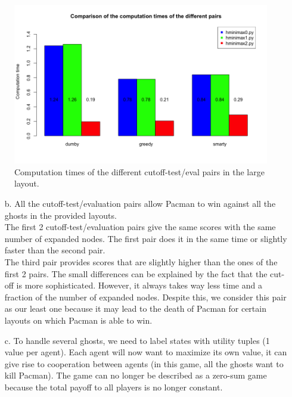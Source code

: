 \documentclass{article}
\begin{document}
		\begin{figure}[H]
			\centering
			\includegraphics[scale=0.45]{plots/3a_times.png} 
			\caption{Computation times of the different cutoff-test/eval pairs in the large layout.}
		\end{figure}
\begin{enumerate}[label=\alph*.,leftmargin=*]	
	\item[b.] All the cutoff-test/evaluation pairs allow Pacman to win against all the ghosts in the provided layouts.\\
	The first 2 cutoff-test/evaluation pairs give the same scores with the same number of expanded nodes. The first pair does it in the same time or slightly faster than the second pair.\\
	The third pair provides scores that are slightly higher than the ones of the first 2 pairs. The small differences can be explained by the fact that the cut-off is more sophisticated. However, it always takes way less time and a fraction of the number of expanded nodes. Despite this, we consider this pair as our least one because it may lead to the death of Pacman for certain layouts on which Pacman is able to win.

    \item[c.] To handle several ghosts, we need to label states with utility tuples (1 value per agent). Each agent will now want to maximize its own value, it can give rise to cooperation between agents (in this game, all the ghosts want to kill Pacman). The game can no longer be described as a zero-sum game because the total payoff to all players is no longer constant.

\end{enumerate}

\end{document}
